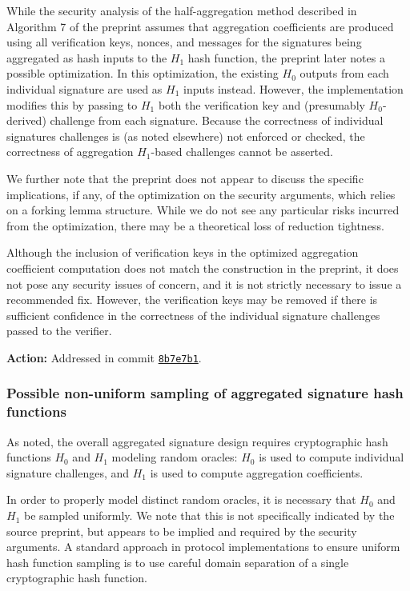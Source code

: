 \documentclass{article}
\begin{document}
While the security analysis of the half-aggregation method described in Algorithm 7 of the preprint assumes that aggregation coefficients are produced using all verification keys, nonces, and messages for the signatures being aggregated as hash inputs to the $H_1$ hash function, the preprint later notes a possible optimization.
In this optimization, the existing $H_0$ outputs from each individual signature are used as $H_1$ inputs instead.
However, the implementation modifies this by passing to $H_1$ both the verification key and (presumably $H_0$-derived) challenge from each signature.
Because the correctness of individual signatures challenges is (as noted elsewhere) not enforced or checked, the correctness of aggregation $H_1$-based challenges cannot be asserted.

We further note that the preprint does not appear to discuss the specific implications, if any, of the optimization on the security arguments, which relies on a forking lemma structure.
While we do not see any particular risks incurred from the optimization, there may be a theoretical loss of reduction tightness.

Although the inclusion of verification keys in the optimized aggregation coefficient computation does not match the construction in the preprint, it does not pose any security issues of concern, and it is not strictly necessary to issue a recommended fix.
However, the verification keys may be removed if there is sufficient confidence in the correctness of the individual signature challenges passed to the verifier.

\textbf{Action:} Addressed in commit \href{https://github.com/serai-dex/serai/commit/8b7e7b1a1c5c98ef31a99df6b726c420e38fd221}{\texttt{8b7e7b1}}.


\subsubsection{Possible non-uniform sampling of aggregated signature hash functions}

As noted, the overall aggregated signature design requires cryptographic hash functions $H_0$ and $H_1$ modeling random oracles: $H_0$ is used to compute individual signature challenges, and $H_1$ is used to compute aggregation coefficients.

In order to properly model distinct random oracles, it is necessary that $H_0$ and $H_1$ be sampled uniformly.
We note that this is not specifically indicated by the source preprint, but appears to be implied and required by the security arguments.
A standard approach in protocol implementations to ensure uniform hash function sampling is to use careful domain separation of a single cryptographic hash function.
\end{document}
